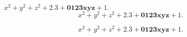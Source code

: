 \documentclass{article}
\begin{document}
$x^2+y^2+z^2+2.3+\mathbf{0123xyz}+1.$
\[x^2+y^2+z^2+2.3+\mathbf{0123xyz}+1.\]
\begin{latin}
\[x^2+y^2+z^2+2.3+\mathbf{0123xyz}+1.\]
\end{latin}
\end{document}
